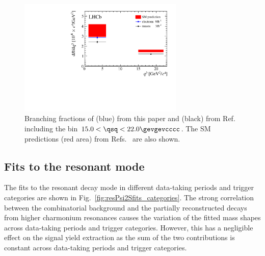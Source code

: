 \begin{figure}[h]
    \centering
    \includegraphics[width=0.7\textwidth]{figures/FigS1.pdf}
    \caption{Branching fractions of (blue) \BuKee from this paper and (black) \BuKmm from Ref.~\cite{LHCb-PAPER-2014-006} including the \qsq bin $15.0<\qsq<22.0\gevgevcccc$. The SM predictions (red area) from Refs.~\cite{Bailey:2015dka,Du:2015tda} are also shown.}
    \label{fig:BFs}
\end{figure}

\clearpage

\subsection*{Fits to the {\boldmath{\BuPsiK}} resonant mode }

The fits to the resonant \BuPsiK decay mode in different data-taking periods and trigger categories are shown in Fig.~\ref{fig:resPsi2Sfits_categories}. The strong correlation between the combinatorial background and the partially reconstructed decays from higher charmonium resonances causes the variation of the fitted mass shapes across data-taking periods and trigger categories. However, this has a negligible effect on the signal yield extraction as the sum of the two contributions is constant across data-taking periods and trigger categories.


\clearpage

